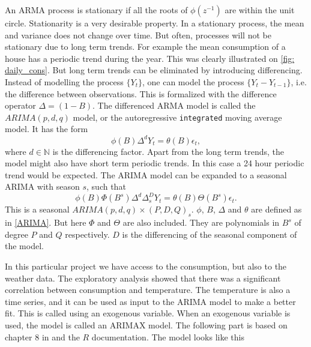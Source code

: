 \noindent An ARMA process is stationary if all the roots of $\phi(z^{-1})$ are within the unit circle. Stationarity is a very desirable property. In a stationary process, the mean and variance does not change over time. But often, processes will not be stationary due to long term trends. For example the mean consumption of a house has a periodic trend during the year. This was clearly illustrated on \cref{fig: daily_cons}. But long term trends can be eliminated by introducing differencing. Instead of modelling the process $\{Y_t\}$, one can model the process $\{Y_t - Y_{t-1}\}$, i.e. the difference between observations. This is formalized with the difference operator $\Delta = (1-B)$. The differenced ARMA model is called the $ARIMA(p,d,q)$ model, or the autoregressive \texttt{integrated} moving average model. It has the form
\begin{equation}
    \phi (B) \Delta^d Y_t = \theta (B) \epsilon_t,
    \label{ARIMA}
\end{equation}
where $d\in \mathbb{N}$ is the differencing factor. Apart from the long term trends, the model might also have short term periodic trends. In this case a 24 hour periodic trend would be expected. The ARIMA model can be expanded to a seasonal ARIMA with season $s$, such that
\begin{equation}
    \phi (B) \Phi (B^s) \Delta^d \Delta_s^D Y_t = \theta (B) \Theta (B^s) \epsilon_t.
    \label{eq:ARIMA}
\end{equation}
This is a seasonal $ARIMA(p,d,q)\times (P,D,Q)_s$. $\phi$, $B$, $\Delta$ and $\theta$ are defined as in \cref{ARIMA}. But here $\Phi$ and $\Theta$ are also included. They are polynomials in $B^s$ of degree $P$ and $Q$ respectively. $D$ is the differencing of the seasonal component of the model. 

\noindent In this particular project we have access to the consumption, but also to the weather data. The exploratory analysis showed that there was a significant correlation between consumption and temperature. The temperature is also a time series, and it can be used as input to the ARIMA model to make a better fit. This is called using an exogenous variable. When an exogenous variable is used, the model is called an ARIMAX model. The following part is based on chapter $8$ in \cite{Time_Series_Analysis} and the $R$ documentation. The model looks like this


